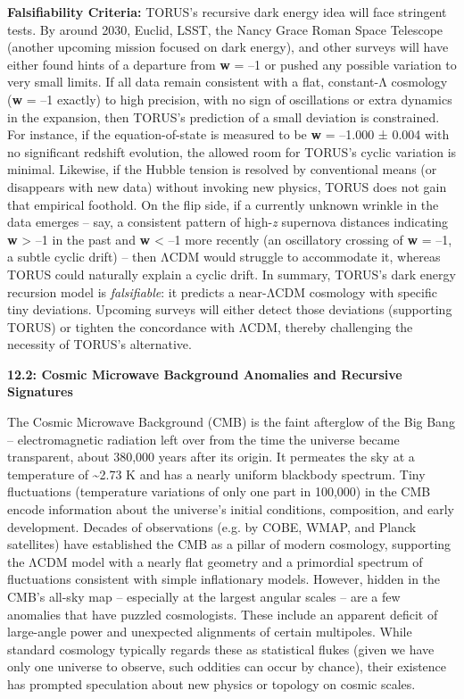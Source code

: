 \documentclass[
]{article}
\begin{document}
\textbf{Falsifiability Criteria:} TORUS's recursive dark energy idea
will face stringent tests. By around 2030, Euclid, LSST, the Nancy Grace
Roman Space Telescope (another upcoming mission focused on dark energy),
and other surveys will have either found hints of a departure from
\textbf{w} = --1 or pushed any possible variation to very small limits.
If all data remain consistent with a flat, constant-Λ cosmology
(\textbf{w} = --1 exactly) to high precision, with no sign of
oscillations or extra dynamics in the expansion, then TORUS's prediction
of a small deviation is constrained. For instance, if the
equation-of-state is measured to be \textbf{w} = --1.000 ± 0.004 with no
significant redshift evolution, the allowed room for TORUS's cyclic
variation is minimal. Likewise, if the Hubble tension is resolved by
conventional means (or disappears with new data) without invoking new
physics, TORUS does not gain that empirical foothold. On the flip side,
if a currently unknown wrinkle in the data emerges -- say, a consistent
pattern of high-\emph{z} supernova distances indicating \textbf{w}
\textgreater{} --1 in the past and \textbf{w} \textless{} --1 more
recently (an oscillatory crossing of \textbf{w} = --1, a subtle cyclic
drift) -- then ΛCDM would struggle to accommodate it, whereas TORUS
could naturally explain a cyclic drift. In summary, TORUS's dark energy
recursion model is \emph{falsifiable}: it predicts a near-ΛCDM cosmology
with specific tiny deviations. Upcoming surveys will either detect those
deviations (supporting TORUS) or tighten the concordance with ΛCDM,
thereby challenging the necessity of TORUS's alternative.

\textbf{12.2: Cosmic Microwave Background Anomalies and Recursive
Signatures}

The Cosmic Microwave Background (CMB) is the faint afterglow of the Big
Bang -- electromagnetic radiation left over from the time the universe
became transparent, about 380,000 years after its origin. It permeates
the sky at a temperature of \textasciitilde2.73 K and has a nearly
uniform blackbody spectrum. Tiny fluctuations (temperature variations of
only one part in 100,000) in the CMB encode information about the
universe's initial conditions, composition, and early development.
Decades of observations (e.g. by COBE, WMAP, and Planck satellites) have
established the CMB as a pillar of modern cosmology, supporting the ΛCDM
model with a nearly flat geometry and a primordial spectrum of
fluctuations consistent with simple inflationary models. However, hidden
in the CMB's all-sky map -- especially at the largest angular scales --
are a few anomalies that have puzzled cosmologists. These include an
apparent deficit of large-angle power and unexpected alignments of
certain multipoles. While standard cosmology typically regards these as
statistical flukes (given we have only one universe to observe, such
oddities can occur by chance), their existence has prompted speculation
about new physics or topology on cosmic scales.
\end{document}
